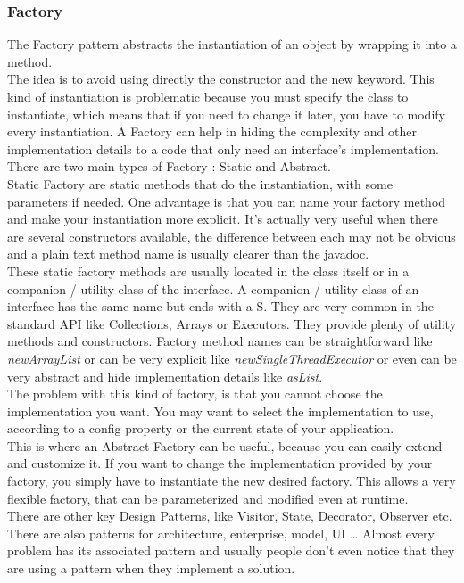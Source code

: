 \subsubsection{Factory}
The Factory pattern abstracts the instantiation of an object by wrapping
it into a method. \\
The idea is to avoid using directly the constructor and the new keyword.
This kind of instantiation is problematic because you must specify
the class to instantiate, which means that if you need to change it
later, you have to modify every instantiation.
A Factory can help in hiding the complexity and other implementation
details to a code that only need an interface's implementation. \\
There are two main types of Factory : Static and Abstract. \\
\newline
Static Factory are static methods that do the instantiation, with some
parameters if needed.
One advantage is that you can name your factory method and make your
instantiation more explicit.
It's actually very useful when there are several constructors available,
the difference between each may not be obvious and a plain text method
name is usually clearer than the javadoc. \\
\newline
These static factory methods are usually located in the class itself or
in a companion / utility class of the interface.
A companion / utility class of an interface has the same name but ends
with a S\@.
They are very common in the standard API like Collections, Arrays or
Executors.
They provide plenty of utility methods and constructors.
Factory method names can be straightforward like \textit{newArrayList}
or can be very explicit like \textit{newSingleThreadExecutor} or even
can be very abstract and hide implementation details like
\textit{asList}. \\
\newline
The problem with this kind of factory, is that you cannot choose the
implementation you want.
You may want to select the implementation to use, according to a config
property or the current state of your application. \\
This is where an Abstract Factory can be useful, because you can easily
extend and customize it.
If you want to change the implementation provided by your factory, you
simply have to instantiate the new desired factory.
This allows a very flexible factory, that can be parameterized and
modified even at runtime.\\
\newline
There are other key Design Patterns, like Visitor, State, Decorator,
Observer etc.
There are also patterns for architecture, enterprise, model, UI \ldots
Almost every problem has its associated pattern and usually people don't
even notice that they are using a pattern when they implement a solution.


